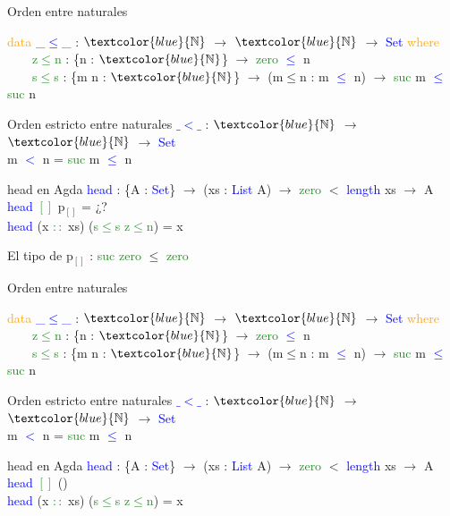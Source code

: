 \documentclass[xcolor=dvipsnames]{beamer} %
\newcommand{\cf}[1]{\textcolor{blue}{#1}}
\newcommand{\ct}[1]{\textcolor{blue}{#1}}
\newcommand{\cc}[1]{\textcolor{ForestGreen}{#1}}
\newcommand{\ck}[1]{\textcolor{orange}{#1}}
\newcommand{\N}{\ct{\mathbb{N}}}
\newcommand{\ra}{\rightarrow}
\begin{document}
\begin{frame}

\begin{block}{Orden entre naturales}

\ck{data} \ct{\_$\leq$\_} : $\N$ $\ra$ $\N$ $\ra$ \ct{Set} \ck{where}\\
\ \ \ \ \cc{z$\leq$n} : \{n : $\N$\}                 $\ra$ \cc{zero}  \ct{$\leq$} n\\
\ \ \ \ \cc{s$\leq$s} : \{m n : $\N$\} $\ra$ (m$\leq$n : m \ct{$\leq$} n) $\ra$ \cc{suc} m \ct{$\leq$} \cc{suc} n

\end{block}

\begin{block}{Orden estricto entre naturales}
\cf{$\_<\_$} : $\N$ $\ra$ $\N$ $\ra$ \ct{Set}\\
m \cf{$<$} n = \cc{suc} m \cf{$\leq$} n
\end{block}

\begin{block}{head en Agda}
    \cf{head} : \{A : \ct{Set}\}  $\ra$ (xs : \ct{List} A) $\ra$ 
    \cc{zero} $<$ \ct{length} xs $\rightarrow$ A \\
    \cf{head} \cc{$[]$} p$_{[]}$ = ¿?\\
    \cf{head} (x \cc{$::$} xs) (\cc{s$\leq$s} \cc{z$\leq$n}) = x
  \end{block}  

\begin{block}{}
El tipo de p$_{[]}$ : \cc{suc} \cc{zero} $\leq$ \cc{zero}
\end{block}

\end{frame}

\begin{frame}

\begin{block}{Orden entre naturales}

\ck{data} \ct{\_$\leq$\_} : $\N$ $\ra$ $\N$ $\ra$ \ct{Set} \ck{where}\\
\ \ \ \ \cc{z$\leq$n} : \{n : $\N$\}                 $\ra$ \cc{zero}  \ct{$\leq$} n\\
\ \ \ \ \cc{s$\leq$s} : \{m n : $\N$\} $\ra$ (m$\leq$n : m \ct{$\leq$} n) $\ra$ \cc{suc} m \ct{$\leq$} \cc{suc} n

\end{block}

\begin{block}{Orden estricto entre naturales}
\cf{$\_<\_$} : $\N$ $\ra$ $\N$ $\ra$ \ct{Set}\\
m \cf{$<$} n = \cc{suc} m \cf{$\leq$} n
\end{block}

\begin{block}{head en Agda}
    \cf{head} : \{A : \ct{Set}\}  $\ra$ (xs : \ct{List} A) $\ra$ 
    \cc{zero} $<$ \ct{length} xs $\rightarrow$ A \\
    \cf{head} \cc{$[]$} ()\\
    \cf{head} (x \cc{$::$} xs) (\cc{s$\leq$s} \cc{z$\leq$n}) = x
\end{block}  

\end{frame}
\end{document}
